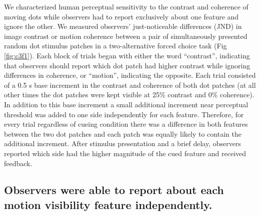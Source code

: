 We characterized human perceptual sensitivity to the contrast and coherence of moving dots while observers had to report exclusively about one feature and ignore the other. We measured observers’ just-noticeable differences (JND) in image contrast or motion coherence between a pair of simultaneously presented random dot stimulus patches in a two-alternative forced choice task (Fig \ref{fig:c3f1}). Each block of trials began with either the word ``contrast'', indicating that observers should report which dot patch had higher contrast while ignoring differences in coherence, or ``motion'', indicating the opposite. Each trial consisted of a 0.5 s base increment in the contrast and coherence of both dot patches (at all other times the dot patches were kept visible at 25\% contrast and 0\% coherence). In addition to this base increment a small additional increment near perceptual threshold was added to one side independently for each feature. Therefore, for every trial regardless of cueing condition there was a difference in both features between the two dot patches and each patch was equally likely to contain the additional increment. After stimulus presentation and a brief delay, observers reported which side had the higher magnitude of the cued feature and received feedback.

\subsection{Observers were able to report about each motion visibility feature independently.}

